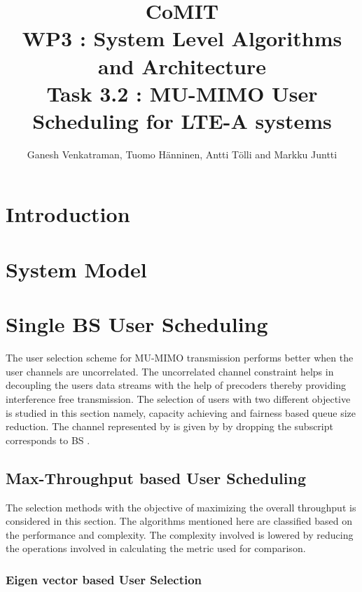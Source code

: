 \documentclass[a4paper,10pt,onecolumn]{article}
\title{\textbf{CoMIT} \\ \textbf{WP3} : System Level Algorithms and Architecture \\ \textbf{Task 3.2} : MU-MIMO User Scheduling for LTE-A systems}
\author{Ganesh Venkatraman, Tuomo H\"{a}nninen, Antti T\"{o}lli and Markku Juntti}
\begin{document}
\maketitle

\tableofcontents

\newpage



\section{Introduction}



\section{System Model}



\section{Single BS User Scheduling} \label{sbus}

The user selection scheme for MU-MIMO transmission performs better when the user  channels are uncorrelated. The uncorrelated channel constraint helps in decoupling the users data streams with the help of precoders thereby providing interference free transmission. The selection of users with two different objective is studied in this section namely, capacity achieving and fairness based queue size reduction. The channel represented by  is given by  by dropping the subscript corresponds to BS .

\subsection{Max-Throughput based User Scheduling} \label{mtbus}

The selection methods with the objective of maximizing the overall throughput is considered in this section. The algorithms mentioned here are classified based on the performance and complexity. The complexity involved is lowered by reducing the operations involved in calculating the metric used for comparison.

\subsubsection{Eigen vector based User Selection}
\end{document}
